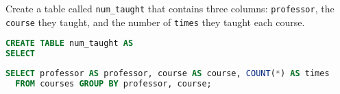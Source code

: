\question Create a table called \lstinline$num_taught$ that contains three
columns: \lstinline$professor$, the \lstinline$course$ they taught, and the
number of \lstinline$times$ they taught each course.

\begin{lstlisting}[language=SQL]
CREATE TABLE num_taught AS
SELECT 
\end{lstlisting}

\begin{solution}[1in]
\begin{lstlisting}[language=SQL]
  SELECT professor AS professor, course AS course, COUNT(*) AS times
  FROM courses GROUP BY professor, course;
\end{lstlisting}
\end{solution}
